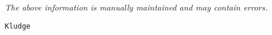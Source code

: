 \label{pkg:kludge}

{\tiny \it The above information is manually maintained and may contain errors.}
\begin{verbatim}
Kludge
\end{verbatim}
